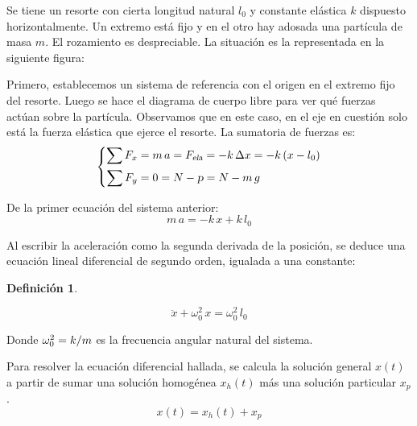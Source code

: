 \documentclass[a5paper,12pt,twoside]{book}
\newtheorem{defn}{{Definición}}[chapter]
\begin{document}
Se tiene un resorte con cierta longitud natural $l_0$ y constante elástica $k$ dispuesto horizontalmente.
Un extremo está fijo y en el otro hay adosada una partícula de masa $m$.
El rozamiento es despreciable.
La situación es la representada en la siguiente figura:

\begin{center}
    \def\svgwidth{0.7\linewidth}
    
\end{center}

Primero, establecemos un sistema de referencia con el origen en el extremo fijo del resorte.
Luego se hace el diagrama de cuerpo libre para ver qué fuerzas actúan sobre la partícula.
Observamos que en este caso, en el eje en cuestión solo está la fuerza elástica que ejerce el resorte.
La sumatoria de fuerzas es:
\begin{equation*}
    \left\{
    \begin{aligned}
        \sum F_x &= m \, a = {{F}_\textsl{{ela}}} = - k \, \Delta x = - k \left(x-l_0\right)
        \\
        \sum F_y &= 0 = N - \textsl{p} = N - m \, g
    \end{aligned}
    \right.
\end{equation*}

De la primer ecuación del sistema anterior:
\begin{equation*}
    m \, a = -k \, x + k \, l_0
\end{equation*}

Al escribir la aceleración como la segunda derivada de la posición, se deduce una ecuación lineal diferencial de segundo orden, igualada a una constante:

\begin{mdframed}[style=MyFrame1]
    \begin{defn}
    \end{defn}
    \begin{equation*}
        \ddot{x} + \omega_0^2 \, x = \omega_0^2 \, l_0
    \end{equation*}
\end{mdframed}

Donde $\omega_0^2 = k/m$ es la frecuencia angular natural del sistema.

Para resolver la ecuación diferencial hallada, se calcula la solución general $x(t)$ a partir de sumar una solución homogénea $x_h(t)$ más una solución particular $x_p$.
\[ x(t) = x_h(t) + x_p \]
\end{document}
